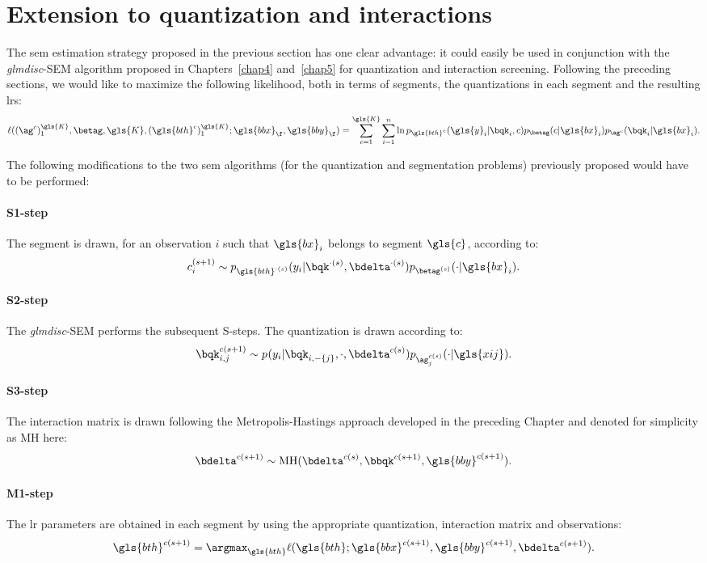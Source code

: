 \section{Extension to quantization and interactions} \label{sec:adding_quant}

The \gls{sem} estimation strategy proposed in the previous section has one clear advantage: it could easily be used in conjunction with the \textit{glmdisc}-SEM algorithm proposed in Chapters~\ref{chap4} and~\ref{chap5} for quantization and interaction screening.
Following the preceding sections, we would like to maximize the following likelihood, both in terms of segments, the quantizations in each segment and the resulting \gls{lr}s:
\[ \ell((\ag^c)_1^{\gls{K}}, \betag,\gls{K},(\gls{bth}^c)_1^{\gls{K}} ; \gls{bbx}_\f, \gls{bby}_\f) = \sum_{c=1}^{\gls{K}} \sum_{i=1}^n \ln p_{\gls{bth}^c}(\gls{y}_i | \bqk_i, c) p_{\betag}(c | \gls{bx}_i) p_{\ag^c}(\bqk_i | \gls{bx}_i).\]

The following modifications to the two \gls{sem} algorithms (for the quantization and segmentation problems) previously proposed would have to be performed:
\paragraph{S1-step} The segment is drawn, for an observation $i$ such that $\gls{bx}_i$ belongs to segment $\gls{c}$, according to:
\[ c_i^{(s+1)} \sim p_{\gls{bth}^{\cdot(s)}}(y_i | \bqk^{\cdot(s)},\bdelta^{\cdot(s)}) p_{\betag^{(s)}}(\cdot | \gls{bx}_i). \]
\paragraph{S2-step} The \textit{glmdisc}-SEM performs the subsequent S-steps. The quantization is drawn according to:
\[ \bqk_{i,j}^{c(s+1)} \sim p_{}(y_i | \bqk_{i,-\{j\}}, \cdot, \bdelta^{c(s)}) p_{\ag_j^{c(s)}}(\cdot | \gls{xij}). \]
\paragraph{S3-step} The interaction matrix is drawn following the Metropolis-Hastings approach developed in the preceding Chapter and denoted for simplicity as MH here:
\[ \bdelta^{c(s+1)} \sim \text{MH}(\bdelta^{c(s)}, \bbqk^{c(s+1)}, \gls{bby}^{c(s+1)}). \]
\paragraph{M1-step} The \gls{lr} parameters are obtained in each segment by using the appropriate quantization, interaction matrix and observations:
\[ \gls{bth}^{c(s+1)} = \argmax_{\gls{bth}} \ell(\gls{bth};\gls{bbx}^{c(s+1)},\gls{bby}^{c(s+1)}, \bdelta^{c(s+1)}). \]
